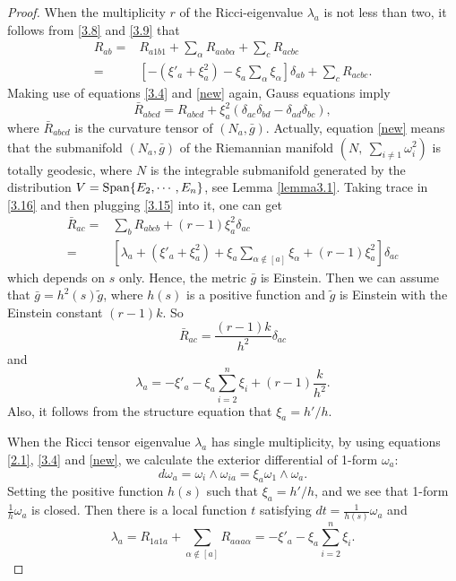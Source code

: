 \documentclass{amsart}
\theoremstyle{definition}
\theoremstyle{remark}
\numberwithin{equation}{section}
\begin{document}
\begin{proof}
		When the multiplicity $r$ of the Ricci-eigenvalue $\lambda_{a}$ is not less than two, it follows from \eqref{3.8} and \eqref{3.9} that 
		\begin{equation}
			\begin{aligned}\label{3.15}
				R_{ab}=&R_{a1 b1}+\sum_{\alpha}R_{a\alpha b\alpha}+\sum_{c} R_{acbc}\\
				=&\left[ -\left( \xi'_a+\xi^2_a \right) -\xi_a \sum_{\alpha} \xi_\alpha \right] \delta_{ab} 
				+\sum_{c} R_{acbc}.
			\end{aligned}
		\end{equation}
		Making use of equations \eqref{3.4} and \eqref{new} again, Gauss equations imply
		\begin{equation}\label{3.16}
			\bar{R}_{abcd}={R}_{abcd}+
			\xi^2_{a}\left( \delta_{ac}\delta_{bd}-\delta_{ad}\delta_{bc} \right),
		\end{equation}
		where $\bar{R}_{abcd}$ is the curvature tensor of $\left( N_a, \bar{g}\right) $.
		Actually, equation \eqref{new} means that the submanifold $(N_a,\bar{g})$ of the Riemannian manifold 
		$(N,~\sum_{i\neq1} \omega^2_{i})$ is totally geodesic, where $N$ is the integrable submanifold generated by the distribution
		$V={\rm Span} \{E_2, \cdots, E_n \} $, see Lemma \ref{lemma3.1}.
		Taking trace in \eqref{3.16} and then plugging \eqref{3.15} into it, one can get
		\begin{equation*}
			\begin{aligned}
				\bar{R}_{ac}=&\sum_{b}R_{abcb}+\left( r-1\right) \xi^2_{a}\delta_{ac}\\
				=& \left[\lambda_a+\left( \xi'_a+\xi^2_a \right) +\xi_a \sum_{\alpha \notin [a]} \xi_\alpha +( r-1) \xi^2_{a} \right] \delta_{ac}
			\end{aligned}
		\end{equation*}
		which depends on $s$ only. Hence, the metric $\bar{g}$ is Einstein.
		Then we can assume that $\bar{g}=h^2(s)\tilde{g}$, where $h(s)$ is a positive function and $\tilde{g}$ is Einstein with the Einstein constant $(r-1)k$. So 
		\[
		\bar{R}_{ac}=\frac{(r-1)k}{h^2}\delta_{ac}
		\]
		and 
		\begin{equation}\label{3.17}
			\lambda_a=- \xi'_a-\xi_a \sum^{n}_{i=2} \xi_i +( r-1)\frac{k}{h^2}.
		\end{equation}
		Also, it follows from the structure equation that $\xi_a=h'/h$.
		
		When the Ricci tensor eigenvalue $\lambda_a$ has single multiplicity,
		by using equations \eqref{2.1}, \eqref{3.4} and \eqref{new}, 
		we calculate the exterior differential of 1-form $\omega_a$: 
		\[
		d\omega_a=\omega_{i}\wedge\omega_{ia}=\xi_a\omega_{1}\wedge\omega_a.
		\]
		Setting the positive function $h(s)$ such that $\xi_a=h'/h$, and we see that
		1-form $\frac{1}{h}\omega_a$ is closed. Then there is a local function $t$ satisfying
		$dt =\frac{1}{h(s)} \omega_a$ and 
		\begin{equation}\label{3.18}
			\lambda_a=R_{1a1 a}+\sum_{\alpha \notin [a]}R_{a\alpha a\alpha}
			=- \xi'_a-\xi_a \sum^{n}_{i=2} \xi_i.
		\end{equation}
		

\end{proof}
\end{document}
